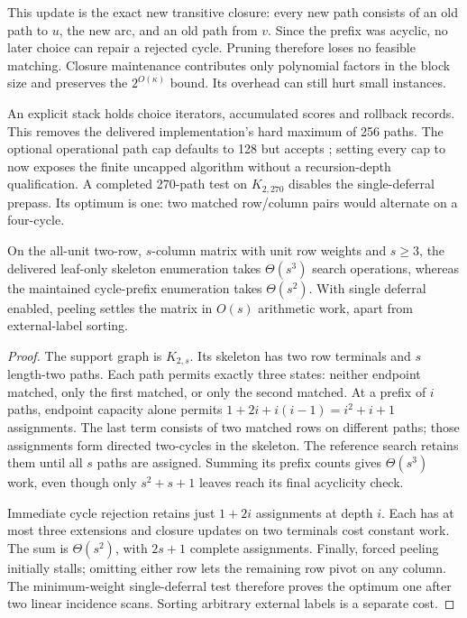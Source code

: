 This update is the exact new transitive closure: every new path consists
of an old path to $u$, the new arc, and an old path from $v$.  Since the
prefix was acyclic, no later choice can repair a rejected cycle.  Pruning
therefore loses no feasible matching.  Closure maintenance contributes
only polynomial factors in the block size and preserves the
$2^{O(\kappa)}$ bound.  Its overhead can still hurt small instances.

An explicit stack holds choice iterators, accumulated scores and rollback
records.  This removes the delivered implementation's hard maximum of
256 paths.  The optional operational path cap defaults to 128 but accepts
; setting every cap to  now exposes the finite
uncapped algorithm without a recursion-depth qualification.  A completed
270-path test on $K_{2,270}$ disables the single-deferral prepass.  Its
optimum is one: two matched row/column pairs would alternate on a
four-cycle.

\begin{proposition}
On the all-unit two-row, $s$-column matrix with unit row weights and
$s\ge3$, the delivered
leaf-only skeleton enumeration takes $\Theta(s^3)$ search operations,
whereas the maintained cycle-prefix enumeration takes $\Theta(s^2)$.
With single deferral enabled, peeling settles the matrix in $O(s)$
arithmetic work, apart from external-label sorting.
\end{proposition}
\begin{proof}
The support graph is $K_{2,s}$.  Its skeleton has two row terminals and
$s$ length-two paths.  Each path permits exactly three states: neither
endpoint matched, only the first matched, or only the second matched.
At a prefix of $i$ paths, endpoint capacity alone permits
$1+2i+i(i-1)=i^2+i+1$ assignments.  The last term consists of two matched
rows on different paths; those assignments form directed two-cycles in
the skeleton.  The reference search retains them until all $s$ paths are
assigned.  Summing its prefix counts gives $\Theta(s^3)$ work, even
though only $s^2+s+1$ leaves reach its final acyclicity check.

Immediate cycle rejection retains just $1+2i$ assignments at depth $i$.
Each has at most three extensions and closure updates on two terminals
cost constant work.  The sum is $\Theta(s^2)$, with $2s+1$ complete
assignments.  Finally, forced peeling initially stalls; omitting either
row lets the remaining row pivot on any column.  The minimum-weight
single-deferral test therefore proves the optimum one after two linear
incidence scans.  Sorting arbitrary external labels is a separate cost.
\end{proof}

